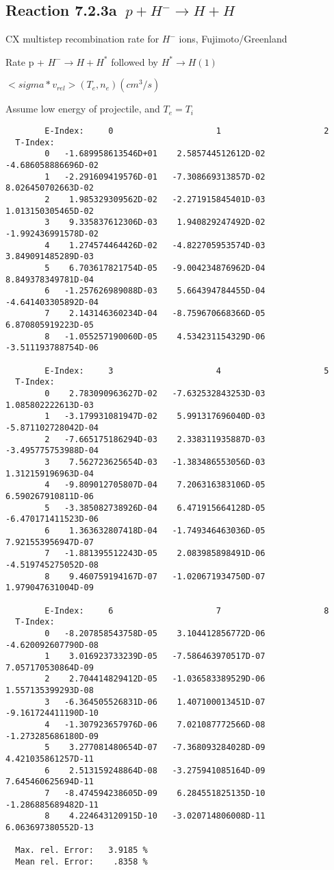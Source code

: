 \documentclass[12pt]{article}
\begin{document}
\subsection{
Reaction 7.2.3a   $\  p + H^{-} \rightarrow  H + H$
}
  CX multistep recombination rate for $H^-$ ions,
  Fujimoto/Greenland

  Rate p + $H^- \rightarrow H + H^*$ followed by $H^* \rightarrow H(1)$

$ <sigma*v_{rel}>(T_e,n_e) (cm^3/s)$

Assume low energy of projectile, and $T_e = T_i$

\begin{small}\begin{verbatim}
        E-Index:     0                     1                     2
  T-Index:
        0   -1.689958613546D+01    2.585744512612D-02   -4.686058886696D-02
        1   -2.291609419576D-01   -7.308669313857D-02    8.026450702663D-02
        2    1.985329309562D-02   -2.271915845401D-03    1.013150305465D-02
        3    9.335837612306D-03    1.940829247492D-02   -1.992436991578D-02
        4    1.274574464426D-02   -4.822705953574D-03    3.849091485289D-03
        5    6.703617821754D-05   -9.004234876962D-04    8.849378349781D-04
        6   -1.257626989088D-03    5.664394784455D-04   -4.641403305892D-04
        7    2.143146360234D-04   -8.759670668366D-05    6.870805919223D-05
        8   -1.055257190060D-05    4.534231154329D-06   -3.511193788754D-06

        E-Index:     3                     4                     5
  T-Index:
        0    2.783090963627D-02   -7.632532843253D-03    1.085802222613D-03
        1   -3.179931081947D-02    5.991317696040D-03   -5.871102728042D-04
        2   -7.665175186294D-03    2.338311935887D-03   -3.495775753988D-04
        3    7.562723625654D-03   -1.383486553056D-03    1.312159196963D-04
        4   -9.809012705807D-04    7.206316383106D-05    6.590267910811D-06
        5   -3.385082738926D-04    6.471915664128D-05   -6.470171411523D-06
        6    1.363632807418D-04   -1.749346463036D-05    7.921553956947D-07
        7   -1.881395512243D-05    2.083985898491D-06   -4.519745275052D-08
        8    9.460759194167D-07   -1.020671934750D-07    1.979047631004D-09

        E-Index:     6                     7                     8
  T-Index:
        0   -8.207858543758D-05    3.104412856772D-06   -4.620092607790D-08
        1    3.016923733239D-05   -7.586463970517D-07    7.057170530864D-09
        2    2.704414829412D-05   -1.036583389529D-06    1.557135399293D-08
        3   -6.364505526831D-06    1.407100013451D-07   -9.161724411190D-10
        4   -1.307923657976D-06    7.021087772566D-08   -1.273285686180D-09
        5    3.277081480654D-07   -7.368093284028D-09    4.421035861257D-11
        6    2.513159248864D-08   -3.275941085164D-09    7.645460625694D-11
        7   -8.474594238605D-09    6.284551825135D-10   -1.286885689482D-11
        8    4.224643120915D-10   -3.020714806008D-11    6.063697380552D-13

  Max. rel. Error:   3.9185 %
  Mean rel. Error:    .8358 %
\end{verbatim}\end{small}
\end{document}
